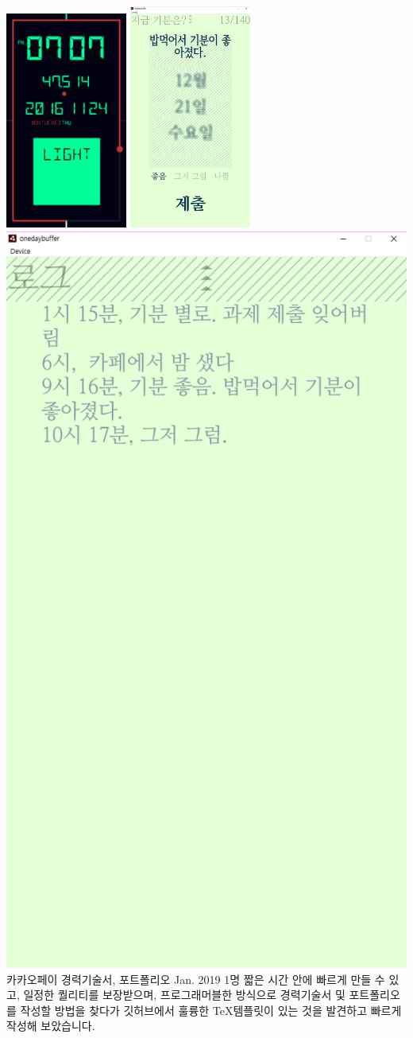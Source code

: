 \begin{cvprojects}
  	\vskip 0.2in
    \includegraphics[width=0.3\textwidth]{./cv/clock}
    \includegraphics[width=0.3\textwidth]{./cv/onedaybuff1}
    \includegraphics[width=0.3\linewidth]{./cv/onedaybuff2}
\clearpage
  \cvproject
    {카카오페이 경력기술서, 포트폴리오 \href{https://github.com/palindrom615/Awesome-CV}{\faGithubSquare}} %
  	{Jan. 2019} %
  	{1명} %
  	{
  	  짧은 시간 안에 빠르게 만들 수 있고, 일정한 퀄리티를 보장받으며, 프로그래머블한 방식으로 경력기술서 및 포트폴리오를 작성할 방법을 찾다가 깃허브에서 훌륭한 \TeX 템플릿이 있는 것을 발견하고 빠르게 작성해 보았습니다.
}
\end{cvprojects}
